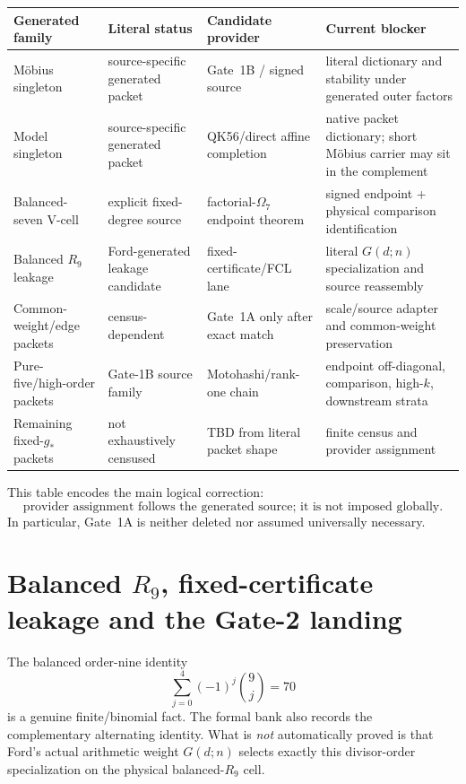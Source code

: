 \documentclass[11pt]{article}
\theoremstyle{definition}
\newcommand{\1}{\mathbf 1}
\begin{document}
\begin{center}
\renewcommand{\arraystretch}{1.18}
\begin{tabularx}{\textwidth}{>{\raggedright\arraybackslash}p{}
>{\raggedright\arraybackslash}p{}
>{\raggedright\arraybackslash}p{}X}
\toprule
Generated family & Literal status & Candidate provider & Current blocker\\
\midrule
M\"obius singleton & source-specific generated packet &
Gate~1B / signed source &
literal dictionary and stability under generated outer factors\\
Model singleton & source-specific generated packet &
QK56/direct affine completion &
native packet dictionary; short M\"obius carrier may sit in the complement\\
Balanced-seven V-cell & explicit fixed-degree source &
factorial-$\Omega_7$ endpoint theorem &
signed endpoint + physical comparison identification\\
Balanced $R_9$ leakage & Ford-generated leakage candidate &
fixed-certificate/FCL lane &
literal $G(d;n)$ specialization and source reassembly\\
Common-weight/edge packets & census-dependent &
Gate~1A only after exact match &
scale/source adapter and common-weight preservation\\
Pure-five/high-order packets & Gate-1B source family &
Motohashi/rank-one chain &
endpoint off-diagonal, comparison, high-$k$, downstream strata\\
Remaining fixed-$g_\ast$ packets & not exhaustively censused &
TBD from literal packet shape &
finite census and provider assignment\\
\bottomrule
\end{tabularx}
\end{center}

This table encodes the main logical correction:
\[
\boxed{
\text{provider assignment follows the generated source; it is not imposed globally.}
}
\]
In particular, Gate~1A is neither deleted nor assumed universally necessary.

\section{Balanced $R_9$, fixed-certificate leakage and the Gate-2 landing}
\label{sec:r9-fcl}

The balanced order-nine identity
\[
\sum_{j=0}^{4}(-1)^j\binom9j=70
\]
is a genuine finite/binomial fact.  The formal bank also records the complementary
alternating identity.  What is \emph{not} automatically proved is that Ford's actual
arithmetic weight $G(d;n)$ selects exactly this divisor-order specialization on the physical
balanced-$R_9$ cell.
\end{document}
